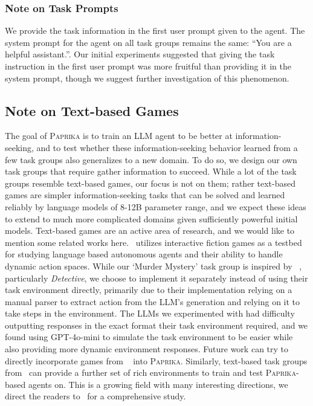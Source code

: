 \documentclass{article}
\newcommand{\ours}[1]{\textsc{Paprika}}
\theoremstyle{plain}
\theoremstyle{definition}
\theoremstyle{remark}
\begin{document}
\subsubsection{Note on Task Prompts}
We provide the task information in the first user prompt given to the agent. The system prompt for the agent on all task groups remains the same: ``You are a helpful assistant.''. Our initial experiments suggested that giving the task instruction in the first user prompt was more fruitful than providing it in the system prompt, though we suggest further investigation of this phenomenon.
\subsection{Note on Text-based Games}
The goal of \ours{} is to train an LLM agent to be better at information-seeking, and to test whether these information-seeking behavior learned from a few task groups also generalizes to a new domain. To do so, we design our own task groups that require gather information to succeed. While a lot of the task groups resemble text-based games, our focus is not on them; rather text-based games are simpler information-seeking tasks that can be solved and learned reliably by language models of 8-12B parameter range, and we expect these ideas to extend to much more complicated domains given sufficiently powerful initial models.
Text-based games are an active area of research, and we would like to mention some related works here.~\citet{hausknecht2020interactivefictiongamescolossal} utilizes interactive fiction games as a testbed for studying language based autonomous agents and their ability to handle dynamic action spaces. While our `Murder Mystery' task group is inspired by ~\citet{hausknecht2020interactivefictiongamescolossal}, particularly \textit{Detective}, we choose to implement it separately instead of using their task environment directly, primarily due to their implementation relying on a manual parser to extract action from the LLM's generation and relying on it to take steps in the environment. The LLMs we experimented with had difficulty outputting responses in the exact format their task environment required, and we found using GPT-4o-mini to simulate the task environment to be easier while also providing more dynamic environment responses. Future work can try to directly incorporate games from ~\citet{hausknecht2020interactivefictiongamescolossal} into \ours{}. Similarly, text-based task groups from~\citet{côté2019textworldlearningenvironmenttextbased,wang2022scienceworldagentsmarter5th,jansen2024discoveryworldvirtualenvironmentdeveloping} can provide a further set of rich environments to train and test \ours{}-based agents on. This is a growing field with many interesting directions, we direct the readers to~\citet{jansen2021systematicsurveytextworlds} for a comprehensive study.
\newpage
\end{document}
